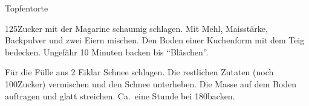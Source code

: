 \begin{recipe}{Topfentorte}

    \begin{ingredients}
    \end{ingredients}

    \begin{instructions}
        125\gram Zucker mit der Magarine schaumig schlagen.
        Mit Mehl, Maisstärke, Backpulver und zwei Eiern mischen.
        Den Boden einer Kuchenform mit dem Teig bedecken.
        Ungefähr 10 Minuten backen bis \enquote{Bläschen}.

        Für die Fülle aus 2 Eiklar Schnee schlagen.
        Die restlichen Zutaten (noch 100\gram Zucker) vermischen und den Schnee unterheben.
        Die Masse auf dem Boden auftragen und glatt streichen.
        Ca.\ eine Stunde bei 180\degC backen.
    \end{instructions}
\end{recipe}
